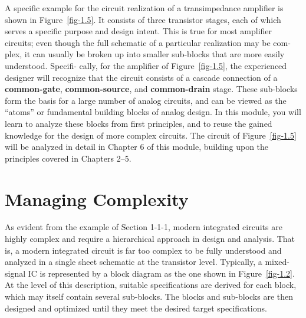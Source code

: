\documentclass[
  11pt,
  letterpaper,
  abstract]{scrbook}
\begin{document}
A specific example for the circuit realization of a transimpedance
amplifier is shown in Figure~\ref{fig-1.5}. It consists of three
transistor stages, each of which serves a specific purpose and design
intent. This is true for most amplifier circuits; even though the full
schematic of a particular realization may be com- plex, it can usually
be broken up into smaller sub-blocks that are more easily understood.
Specifi- cally, for the amplifier of Figure~\ref{fig-1.5}, the
experienced designer will recognize that the circuit consists of a
cascade connection of a \textbf{common-gate}, \textbf{common-source},
and \textbf{common-drain} stage. These sub-blocks form the basis for a
large number of analog circuits, and can be viewed as the ``atoms'' or
fundamental building blocks of analog design. In this module, you will
learn to analyze these blocks from first principles, and to reuse the
gained knowledge for the design of more complex circuits. The circuit of
Figure~\ref{fig-1.5} will be analyzed in detail in Chapter 6 of this
module, building upon the principles covered in Chapters 2--5.

\section{Managing Complexity}\label{managing-complexity}

As evident from the example of Section 1-1-1, modern integrated circuits
are highly complex and require a hierarchical approach in design and
analysis. That is, a modern integrated circuit is far too complex to be
fully understood and analyzed in a single sheet schematic at the
transistor level. Typically, a mixed-signal IC is represented by a block
diagram as the one shown in Figure~\ref{fig-1.2}. At the level of this
description, suitable specifications are derived for each block, which
may itself contain several sub-blocks. The blocks and sub-blocks are
then designed and optimized until they meet the desired target
specifications.
\end{document}
